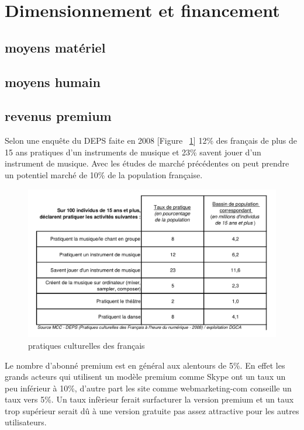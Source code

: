 \documentclass[a4,12pt]{article}
\begin{document}
\section{Dimensionnement et financement}


\subsection{moyens matériel}
\subsection{moyens humain}
\subsection{revenus premium}

Selon une enquête du DEPS faite en 2008 [Figure ~\ref{fig:pratiques}]
12\% des français de plus de 15 ans pratiques d'un instruments de musique et 23\% savent
jouer d'un instrument de musique. Avec les études de marché précédentes on peut prendre un potentiel marché de 10\% de la population française.\\

\begin{figure}[!h]
    \centering
    \includegraphics[width=400pt]{pratiques_culturelles_des_francais.png}
    \caption{pratiques culturelles des français}
    \label{fig:pratiques}
\end{figure}

Le nombre d'abonné premium est en général aux alentours de 5\%. En effet les grands acteurs qui utilisent un modèle premium comme Skype ont un taux un peu inférieur à 10\%, d'autre part les site comme webmarketing-com conseille un taux vers 5\%. Un taux infèrieur ferait surfacturer la version premium et un taux trop supérieur serait dû à une version gratuite pas assez attractive pour les autres utilisateurs.\\
\end{document}

